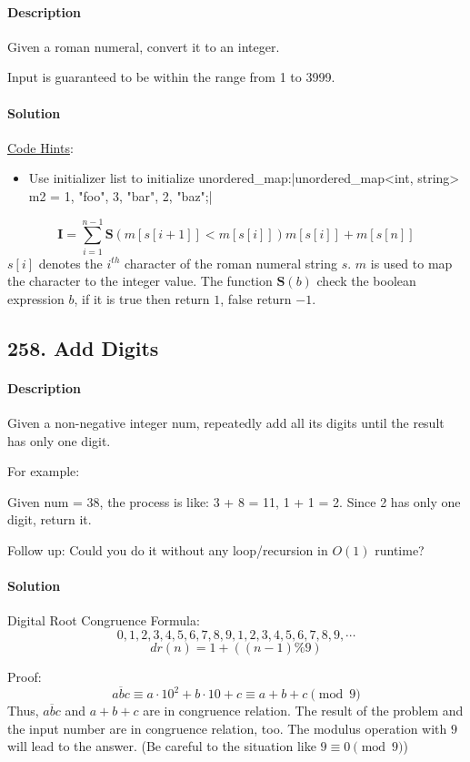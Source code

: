 \paragraph{Description}

Given a roman numeral, convert it to an integer.

Input is guaranteed to be within the range from 1 to 3999.

\paragraph{Solution}
\underline{Code Hints}:
\begin{itemize}
    \item Use initializer list to initialize unordered\_map:|unordered_map<int, string> m2 = {{1, "foo"}, {3, "bar"}, {2, "baz"}};|
\end{itemize}

$$\bm{I}=\sum^{n-1}_{i=1}{\bm{S}(m[s[i+1]]<m[s[i]])m[s[i]]}+m[s[n]]$$
$s[i]$ denotes the $i^{th}$ character of the roman numeral string $s$. $m$ is used to map the character to the integer value. The function $\bm{S}(b)$ check the boolean expression $b$, if it is true then return $1$, false return $-1$. 

\subsection{258. Add Digits}

\paragraph{Description}

Given a non-negative integer num, repeatedly add all its digits until the result has only one digit.

For example:

Given num = 38, the process is like: 3 + 8 = 11, 1 + 1 = 2. Since 2 has only one digit, return it.

Follow up:
Could you do it without any loop/recursion in $O(1)$ runtime?

\paragraph{Solution}

Digital Root Congruence Formula:
$$0, 1, 2, 3, 4, 5, 6, 7, 8, 9, 1, 2, 3, 4, 5, 6, 7, 8, 9,\cdots$$
$$dr(n)=1+((n - 1) \% 9)$$

Proof:
$$\overline{abc}\equiv a\cdot 10^2+b\cdot 10+c\equiv a+b+c \pmod{9}$$
Thus, $\overline{abc}$ and $a+b+c$ are in congruence relation. The result of the problem and the input number are in congruence relation, too. The modulus operation with $9$ will lead to the answer. (Be careful to the situation like $9\equiv 0\pmod{9}$)